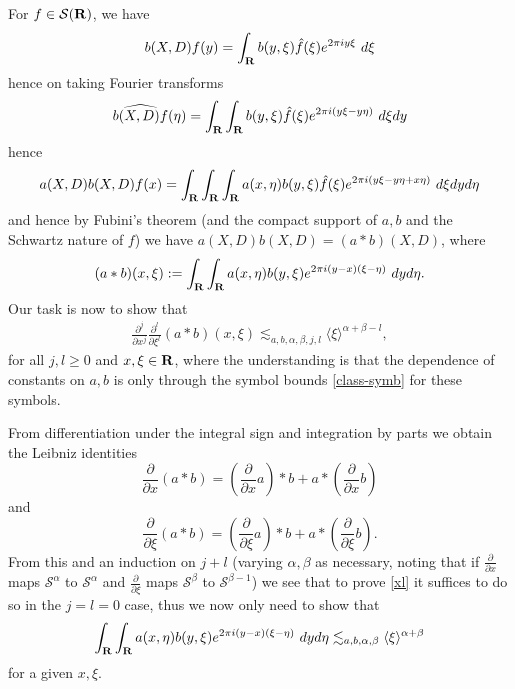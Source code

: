 \documentclass[11pt]{article}
\theoremstyle{definition}
\begin{document}
For \({f \in {\mathcal S}({\bf R})}\), we have 
\[\displaystyle  b(X,D) f(y) = \int_{\bf R} b(y,\xi) \hat f(\xi) e^{2\pi i y \xi}\ d\xi\]
 hence on taking Fourier transforms 
\[\displaystyle  \widehat{b(X,D) f}(\eta) = \int_{\bf R} \int_{\bf R} b(y,\xi) \hat f(\xi) e^{2\pi i (y \xi- y\eta)}\ d\xi dy\]
 hence 
\[\displaystyle  a(X,D) b(X,D) f(x) = \int_{\bf R} \int_{\bf R} \int_{\bf R} a(x,\eta) b(y,\xi) \hat f(\xi) e^{2\pi i (y \xi-y\eta + x \eta)}\ d\xi dy d\eta\]
 and hence by Fubini’s theorem (and the compact support of \({a,b}\) and the Schwartz nature of \({f}\)) we have \({a(X,D) b(X,D) = (a \ast b)(X,D)}\), where 
\begin{align}\label{ast-def}
  (a \ast b)(x,\xi) := \int_{\bf R} \int_{\bf R} a(x,\eta) b(y,\xi) e^{2\pi i (y-x)(\xi-\eta)}\ dy d\eta. 
\end{align}
 Our task is now to show that 
\begin{align}\label{xl}
  \frac{\partial^j}{\partial x^j} \frac{\partial^l}{\partial \xi^l} (a \ast b)(x,\xi) \lesssim_{a,b,\alpha,\beta,j,l} \langle \xi \rangle^{\alpha+\beta-l}, 
\end{align}
 for all \({j,l \geq 0}\) and \({x,\xi \in {\bf R}}\), where the understanding is that the dependence of constants on \({a,b}\) is only through the symbol bounds \eqref{class-symb} for these symbols.

From differentiation under the integral sign and integration by parts we obtain the Leibniz identities 
\[\displaystyle  \frac{\partial}{\partial x} (a \ast b) = (\frac{\partial}{\partial x} a) \ast b + a \ast (\frac{\partial}{\partial x} b)\]
 and 
\[\displaystyle  \frac{\partial}{\partial \xi} (a \ast b) = (\frac{\partial}{\partial \xi} a) \ast b + a \ast (\frac{\partial}{\partial \xi} b).\]
 From this and an induction on \({j+l}\) (varying \({\alpha,\beta}\) as necessary, noting that if \({\frac{\partial}{\partial x}}\) maps \({{\mathcal S}^\alpha}\) to \({{\mathcal S}^\alpha}\) and \({\frac{\partial}{\partial \xi}}\) maps \({{\mathcal S}^\beta}\) to \({{\mathcal S}^{\beta-1}}\)) we see that to prove \eqref{xl} it suffices to do so in the \({j=l=0}\) case, thus we now only need to show that 
\begin{align}\label{yo}
  \int_{\bf R} \int_{\bf R} a(x,\eta) b(y,\xi) e^{2\pi i (y-x)(\xi-\eta)}\ dy d\eta \lesssim_{a,b,\alpha,\beta} \langle \xi \rangle^{\alpha+\beta} 
\end{align}
 for a given \({x,\xi}\).
\end{document}

